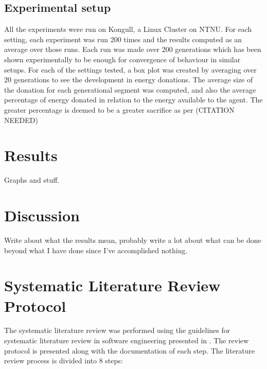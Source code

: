 \documentclass[a4paper]{book}
\begin{document}
\section{Experimental setup}

All the experiments were run on Kongull, a Linux Cluster on NTNU. For each setting, each experiment was run 200 times and the results computed as an average over those runs. 
Each run was made over 200 generations which has been shown experimentally to be enough for convergence of behaviour in similar setups. 
For each of the settings tested, a box plot was created by averaging over 20 generations to see the development in energy donations. The average size of the donation
for each generational segment was computed, and also the average percentage of energy donated in relation to the energy available to the agent. The greater percentage 
is deemed to be a greater sacrifice as per (CITATION NEEDED) 

\chapter{Results}

Graphs and stuff.


\chapter{Discussion}

Write about what the results mean, probably write a lot about what can be done beyond what I have done since I've accomplished nothing.


\chapter{Systematic Literature Review Protocol}\label{T-B}
\label{cha:STL}



The systematic literature review was performed using the guidelines for systematic 
literature review in software engineering presented in \cite{keele_guidelines_2007}.
The review protocol is presented along with the documentation of each step.
The literature review process is divided into 8 steps: %
\end{document}

